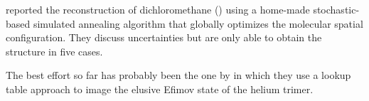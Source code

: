 \citet{Gagnon08} reported the reconstruction of dichloromethane () using a home-made \footnotemark stochastic-based simulated annealing algorithm that globally optimizes the molecular spatial configuration. They discuss uncertainties but are only able to obtain the structure in five cases.


The best effort so far has probably been the one by \citet{Kunitski15} in which they use a lookup table approach to image the elusive Efimov state of the helium trimer.